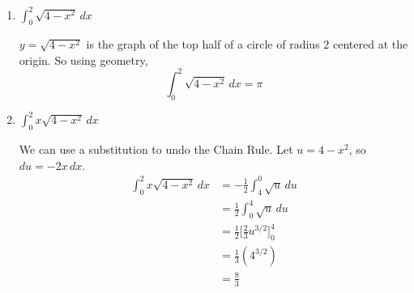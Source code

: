 \documentclass{article}
\begin{document}
\begin{enumerate}
\begin{enumerate}
        \begin{solution}
            We can use a substitution to turn this into an integral we can evaluate using the power rule, $u=4-x$, $du=-dx$. 
            \begin{align*}
                \int_0^2 \sqrt{4-x}\, dx &= -\int_4^2 \sqrt{u}\,du \\
                &= \int_2^4 \sqrt{u}\,du \\
                &= \big[\tfrac{2}{3}u^{3/2}\big]_2^4 \\
                &= \tfrac{2}{3}(4^{3/2}-2^{3/2}) \\
                &= \tfrac{2}{3}(8-2\sqrt{2}) \\
                &= \tfrac{4}{3}(4-\sqrt{2})
            \end{align*}
        \end{solution}

        \item 
        \begin{problem}[\vfill]
            $\displaystyle \int_0^2 \sqrt{4-x^2}\, dx$
        \end{problem}
        \begin{solution}
        $y=\sqrt{4-x^2}$ is the graph of the top half of a circle of radius $2$ centered at the origin. So using geometry, \[\int_0^2 \sqrt{4-x^2}\, dx=\pi\]
        \end{solution}
        
        \item 
        \begin{problem}[\vfill]
            $\displaystyle \int_0^2 x\sqrt{4-x^2}\, dx$
        \end{problem}
        \begin{solution}
            We can use a substitution to undo the Chain Rule. Let $u=4-x^2$, so $du=-2x\,dx$.
            \begin{align*}
                \int_0^2 x\sqrt{4-x^2}\,dx &= 
                -\tfrac{1}{2}\!\int_4^0\sqrt{u}\,du \\
                &= \tfrac{1}{2}\!\int_0^4 \sqrt{u}\, du \\
                &= \tfrac{1}{2}\big[\tfrac{2}{3}u^{3/2}\big]_0^4 \\
                &= \tfrac{1}{3}(4^{3/2}) \\
                &= \tfrac{8}{3}
            \end{align*}
        \end{solution}


\end{enumerate}
\end{enumerate}
\end{document}
